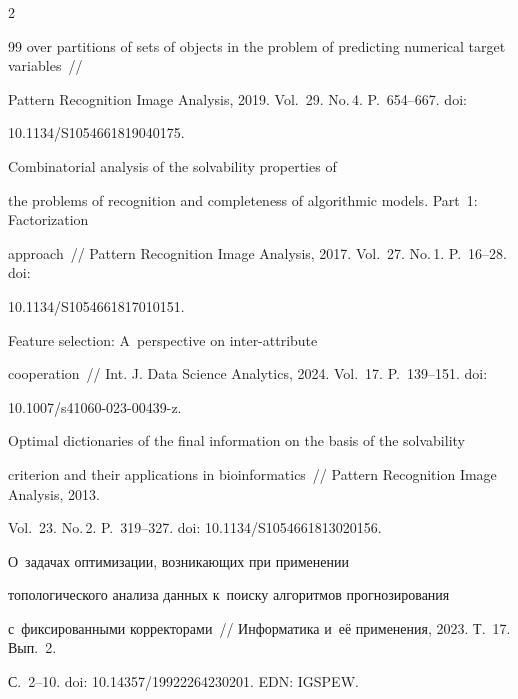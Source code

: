 \begin{multicols}{2}
{{\begin{thebibliography}{99}
over partitions of sets of objects in the problem of predicting numerical target variables~// 

Pattern Recognition Image Analysis, 2019. Vol.~29. No.\,4. P.~654--667. doi: 

10.1134/S1054661819040175. 


   Combinatorial analysis of the solvability properties of 

the problems of recognition and completeness of algorithmic models. Part~1: Factorization 

approach~// Pattern Recognition Image Analysis, 2017. Vol.~27. No.\,1. P.~16--28. doi: 

10.1134/S1054661817010151.


   Feature selection: A~perspective on inter-attribute 

cooperation~// Int. J. Data Science Analytics, 2024. Vol.~17. P.~139--151. doi:  

10.1007/s41060-023-00439-z.


   Optimal dictionaries of the final information on the basis of the solvability 

criterion and their applications in bioinformatics~// Pattern Recognition Image Analysis, 2013. 

Vol.~23. No.\,2. P.~319--327. doi: 10.1134/S1054661813020156.


 О~задачах оптимизации, воз\-ни\-ка\-ющих при применении 

топологического анализа данных к~поиску алгоритмов прогнозирования 

с~фиксированными корректорами~// Информатика и~её применения, 2023. Т.~17. Вып.~2. 

С.~2--10. doi: 10.14357/19922264230201. EDN: IGSPEW.



\end{thebibliography}



 }

 }



\end{multicols}



